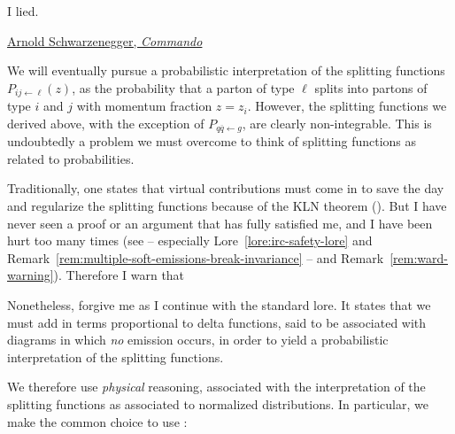 \epigraph{I lied.}{\href{https://www.youtube.com/watch?v=_wk-jT9rn-8}{Arnold Schwarzenegger, \textit{Commando}}}

We will eventually pursue a probabilistic interpretation of the splitting functions \(P_{ij \leftarrow \ell}(z)\), as the probability that a parton of type \(\ell\) splits into partons of type \(i\) and \(j\) with momentum fraction \(z = z_i\).
%
However, the splitting functions we derived above, with the exception of \(P_{q\overline{q} \leftarrow g}\), are clearly non-integrable.
%
This is undoubtedly a problem we must overcome to think of splitting functions as related to probabilities.

Traditionally, one states that virtual contributions must come in to save the day and regularize the splitting functions because of the KLN theorem ().
%
But I have never seen a proof or an argument that has fully satisfied me, and I have been hurt too many times (see  -- especially Lore~\ref{lore:irc-safety-lore} and Remark~\ref{rem:multiple-soft-emissions-break-invariance} -- and Remark~\ref{rem:ward-warning}).
%
Therefore I warn that


Nonetheless, forgive me as I continue with the standard lore.
%
It states that we must add in terms proportional to delta functions, said to be associated with diagrams in which \textit{no} emission occurs, in order to yield a probabilistic interpretation of the splitting functions.

We therefore use \textit{physical} reasoning, associated with the interpretation of the splitting functions as associated to normalized distributions.
%
In particular, we make the common choice to use :

